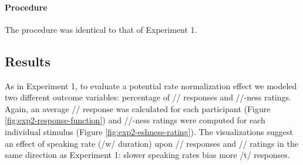 
\paragraph{Procedure}

The procedure was identical to that of Experiment 1.

\subsection{Results}

As in Experiment 1, to evaluate a potential rate normalization effect we modeled two different outcome variables: percentage of /\textesh/ responses and /\textesh/-ness ratings. Again, an average /\textesh/ response was calculated for each participant (Figure \ref{fig:exp2-response-function}) and /\textesh/-ness ratings were computed for each individual stimulus (Figure \ref{fig:exp2-eshness-rating}). The visualizations suggest an effect of speaking rate (/w/ duration) upon /\textesh/ responses and /\textesh/ ratings in the same direction as Experiment 1: slower speaking rates bias more /t\textesh/ responses.

